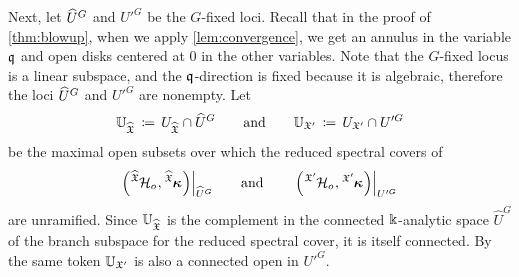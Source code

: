 \documentclass[twoside,leqno]{article}
\numberwithin{equation}{section}
\theoremstyle{plain}
\theoremstyle{definition}
\begin{document}
Next, let $\widehat U^G$ and $U'^G$ be the $G$-fixed loci.
Recall that in the proof of \cref{thm:blowup}, when we apply \cref{lem:convergence}, we get an annulus in the variable $\mathfrak q$ and open disks centered at $0$ in the other variables.
Note that the $G$-fixed locus is a linear subspace, and the $\mathfrak q$-direction is fixed because it is algebraic, therefore the loci $\widehat U^G$ and $U'^G$ are nonempty.
Let 
\[
\mathbb{U}_{\widehat{\mathfrak X}} \, \coloneqq \,  U_{\widehat{\mathfrak X}} \cap \widehat{U}^G \qquad \text{and}  
\qquad \mathbb{U}_{\mathfrak X'} \, \coloneqq \, U_{\mathfrak X'} \cap U'^G
\]
be the maximal open subsets over which the reduced spectral covers of 
\[\Big(\tensor[^{\widehat{\fX}}]{{\cH_{o}}}{},\tensor[^{\widehat{\fX}}]{\bkappa}{}\Big)\Big|_{\widehat{U}^G} \qquad\text{and}\qquad\left.\left(\tensor[^{\fX'}]{{\cH_{o}}}{},\tensor[^{\fX'}]{\bkappa}{}\right)\right|_{U'^G}\] are unramified.
Since $\mathbb{U}_{\widehat{\mathfrak X}}$ is the complement in the connected $\Bbbk$-analytic space $\widehat{U}^G$ of the branch subspace for the reduced spectral cover, it is itself connected.
By the same token $\mathbb{U}_{\mathfrak X'}$ is also a connected open in $U'^G$.
\end{document}
